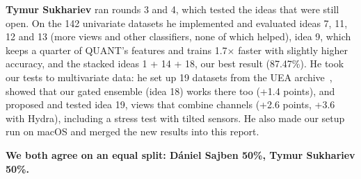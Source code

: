 \documentclass[conference]{IEEEtran}
\begin{document}
\textbf{Tymur Sukhariev} ran rounds 3 and 4, which tested the ideas that were still open. On the 142 univariate datasets he implemented and evaluated ideas 7, 11, 12 and 13 (more views and other classifiers, none of which helped), idea 9, which keeps a quarter of QUANT's features and trains 1.7$\times$ faster with slightly higher accuracy, and the stacked ideas 1 + 14 + 18, our best result (87.47\%). He took our tests to multivariate data: he set up 19 datasets from the UEA archive~\cite{uea}, showed that our gated ensemble (idea 18) works there too (+1.4 points), and proposed and tested idea 19, views that combine channels (+2.6 points, +3.6 with Hydra), including a stress test with tilted sensors. He also made our setup run on macOS and merged the new results into this report.

\textbf{We both agree on an equal split: D\'aniel Sajben 50\%, Tymur Sukhariev 50\%.}
\end{document}
